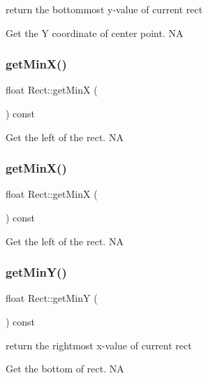 return the bottommost y-\/value of current rect 

Get the Y coordinate of center point.  NA \mbox{\label{classRect_aeb245e3c08e311b8d6cf7ca0ab5b71e5}} 
\subsubsection{\texorpdfstring{get\+Min\+X()}{getMinX()}\hspace{0.1cm}{\footnotesize\ttfamily [1/2]}}
{\footnotesize\ttfamily float Rect\+::get\+MinX (\begin{DoxyParamCaption}{ }\end{DoxyParamCaption}) const}

Get the left of the rect.  NA \mbox{\label{classRect_aeb245e3c08e311b8d6cf7ca0ab5b71e5}} 
\subsubsection{\texorpdfstring{get\+Min\+X()}{getMinX()}\hspace{0.1cm}{\footnotesize\ttfamily [2/2]}}
{\footnotesize\ttfamily float Rect\+::get\+MinX (\begin{DoxyParamCaption}{ }\end{DoxyParamCaption}) const}

Get the left of the rect.  NA \mbox{\label{classRect_abe95583121eb9041bd9dcedbebbdb704}} 
\subsubsection{\texorpdfstring{get\+Min\+Y()}{getMinY()}\hspace{0.1cm}{\footnotesize\ttfamily [1/2]}}
{\footnotesize\ttfamily float Rect\+::get\+MinY (\begin{DoxyParamCaption}{ }\end{DoxyParamCaption}) const}



return the rightmost x-\/value of current rect 

Get the bottom of rect.  NA \mbox{\label{classRect_abe95583121eb9041bd9dcedbebbdb704}} 
